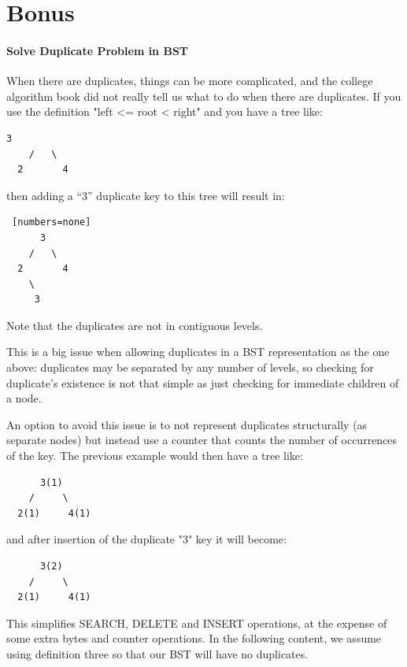 \documentclass[../main.tex]{subfiles}
\begin{document}


\section{Bonus}
\paragraph{Solve Duplicate Problem in BST} When there are duplicates, things can be more complicated, and the college algorithm book did not really tell us what to do when there are duplicates.  If you use the definition "left <= root < right" and you have a tree like:
\begin{lstlisting}[numbers=none]
      3
    /   \
  2       4
\end{lstlisting}

then adding a ``3'' duplicate key to this tree will result in:
\begin{lstlisting} [numbers=none]
      3
    /   \
  2       4
    \
     3
\end{lstlisting}
Note that the duplicates are not in contiguous levels.

This is a big issue when allowing duplicates in a BST representation as the one above: duplicates may be separated by any number of levels, so checking for duplicate's existence is not that simple as just checking for immediate children of a node.

An option to avoid this issue is to not represent duplicates structurally (as separate nodes) but instead use a counter that counts the number of occurrences of the key. The previous example would then have a tree like:
\begin{lstlisting}
      3(1)
    /     \
  2(1)     4(1)
  \end{lstlisting}

and after insertion of the duplicate "3" key it will become:
\begin{lstlisting}
      3(2)
    /     \
  2(1)     4(1)
  \end{lstlisting}

This simplifies SEARCH, DELETE and INSERT operations, at the expense of some extra bytes and counter operations. In the following content, we assume using definition three so that our BST will have no duplicates. 
\end{document}

